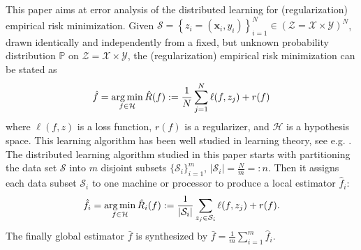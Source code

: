 \documentclass{article}
\newcommand{\argmin}{\operatornamewithlimits{arg\,min}}
\begin{document}
This paper aims at error analysis of the distributed learning for (regularization) empirical risk minimization.
Given $\mathcal{S}=\left\{z_i=(\mathbf  x_i,y_i)\right\}_{i=1}^N \in (\mathcal{Z}=\mathcal{X}\times \mathcal{Y})^N$,
drawn identically and independently from a fixed,
but unknown probability  distribution $\mathbb{P}$ on
$\mathcal{Z}=\mathcal{X}\times\mathcal{Y}$,
the (regularization) empirical risk minimization can be stated as
\begin{align}
\label{def-empirical-f}
  \hat{f}=\argmin_{f\in\mathcal{H}} \hat{R}(f):=\frac{1}{N}\sum_{j=1}^N\ell(f,z_j)+r(f)
\end{align}
where $\ell(f,z)$ is a loss function, $r(f)$ is a regularizer, and $\mathcal{H}$ is a hypothesis space.
This learning algorithm  has been well studied in learning theory,
see e.g. \cite{de2005model,caponnetto2007optimal,steinwart2009optimal,smale2007learning,steinwart2008support}.
The distributed learning algorithm studied in this paper starts with partitioning the
data set $\mathcal{S}$ into $m$ disjoint subsets $\{\mathcal{S}_i\}_{i=1}^m$, $|\mathcal{S}_i|=\frac{N}{m}=:n$.
Then it assigns each data subset $\mathcal{S}_i$ to one
machine or processor to produce a local estimator $\hat{f}_i$:
\begin{align*}
  \hat{f}_i=\argmin_{f\in\mathcal{H}}\hat{R}_i(f):=
    \frac{1}{|\mathcal{S}_i|}\sum_{z_j\in\mathcal{S}_i}\ell(f,z_j)+r(f).
\end{align*}
The finally  global estimator $\bar{f}$ is synthesized by
$\bar{f}=\frac{1}{m}\sum_{i=1}^m\hat{f}_i.$
\end{document}
